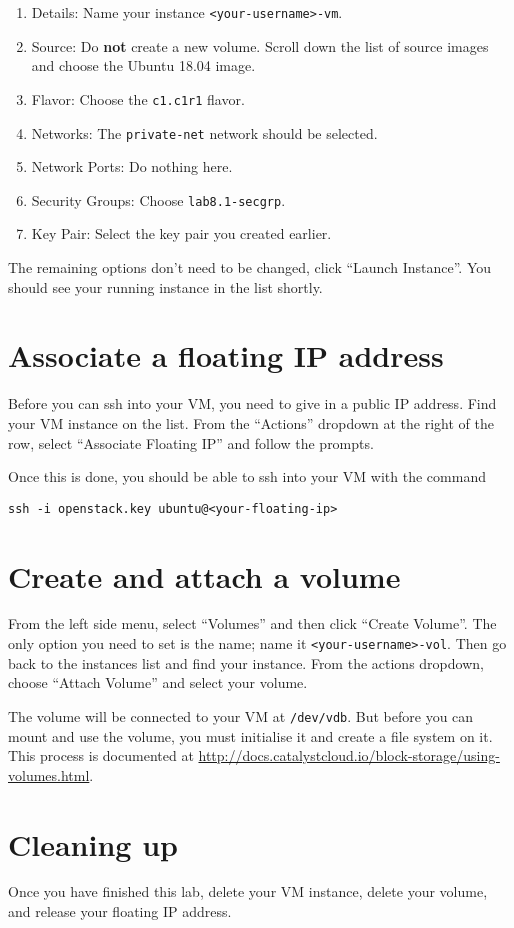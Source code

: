 \documentclass{article}
\begin{document}
\begin{enumerate}
  \item Details: Name your instance \texttt{<your-username>-vm}.
  \item Source: Do \textbf{not} create a new volume. Scroll down the list of source images and choose the Ubuntu 18.04 image.
  \item Flavor: Choose the \texttt{c1.c1r1} flavor.
  \item Networks: The \texttt{private-net} network should be selected.
  \item Network Ports: Do nothing here.
  \item Security Groups: Choose \texttt{lab8.1-secgrp}.
  \item Key Pair: Select the key pair you created earlier.
 \end{enumerate}
 
 The remaining options don't need to be changed, click ``Launch Instance''. You should see your running instance in the list shortly.
 
 \section{Associate a floating IP address}
 Before you can ssh into your VM, you need to give in a public IP address. Find your VM instance on the list. From the ``Actions'' dropdown at the right of the row, select ``Associate Floating IP'' and follow the prompts.
 
 Once this is done, you should be able to ssh into your VM with the command
 
 \texttt{ssh -i openstack.key ubuntu@<your-floating-ip>}

\section{Create and attach a volume}
From the left side menu, select ``Volumes'' and then click ``Create Volume''. The only option you need to set is the name; name it \texttt{<your-username>-vol}. Then go back to the instances list and find your instance. From the actions dropdown, choose ``Attach Volume'' and select your volume.

The volume will be connected to your VM at \texttt{/dev/vdb}. But before you can mount and use the volume, you must initialise it and create a file system on it. This process is documented at \url{http://docs.catalystcloud.io/block-storage/using-volumes.html}.

\section{Cleaning up}
Once you have finished this lab, delete your VM instance, delete your volume, and release your floating IP address.
\end{document}
